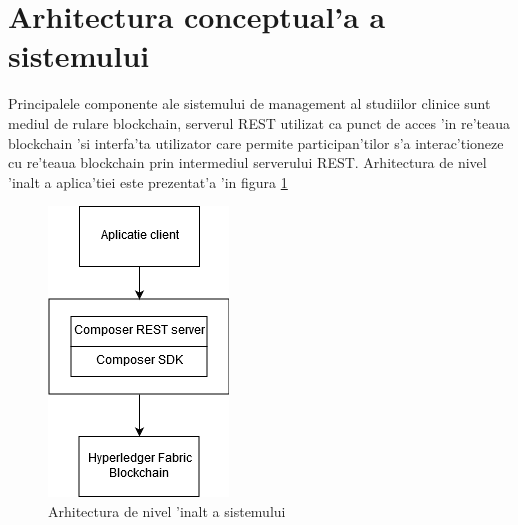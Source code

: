 \documentclass[12pt,a4paper,twoside]{report}
\begin{document}
    \section{Arhitectura conceptual'a a sistemului}
    Principalele componente ale sistemului de management al studiilor clinice sunt mediul de rulare blockchain, serverul REST utilizat ca punct de acces 'in re'teaua blockchain 'si interfa'ta utilizator care permite participan'tilor s'a interac'tioneze cu re'teaua blockchain prin intermediul serverului REST. Arhitectura de nivel 'inalt a aplica'tiei este prezentat'a 'in figura \ref{fig:arhh}
    	\begin{figure}[H]
		\begin{center}
			\includegraphics[scale=0.46]{img/arh_h.png}
			\caption{Arhitectura de nivel 'inalt a sistemului}
  			\label{fig:arhh}
  		\end{center}
  		\end{figure}
    
\end{document}
